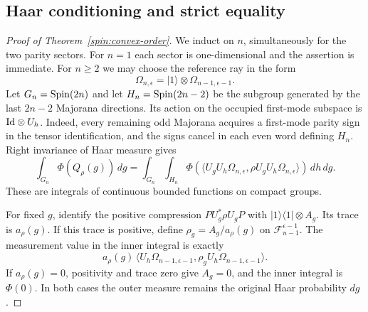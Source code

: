 \subsection{Haar conditioning and strict equality}

\begin{proof}[Proof of Theorem~\ref{spin:convex-order}]
We induct on $n$, simultaneously for the two parity sectors.  For $n=1$
each sector is one-dimensional and the assertion is immediate.  For
$n\ge2$ we may choose the reference ray in the form
\[
 \Omega_{n,\epsilon}=|1\rangle\otimes\Omega_{n-1,\epsilon-1}.
\]
Let $G_n=\operatorname{Spin}(2n)$ and let $H_n=\operatorname{Spin}(2n-2)$ be the subgroup
generated by the last $2n-2$ Majorana directions.  Its action on the
occupied first-mode subspace is $\mathrm{Id}\otimes U_h$.  Indeed, every
remaining odd Majorana acquires a first-mode parity sign in the tensor
identification, and the signs cancel in each even word defining $H_n$.
Right invariance of Haar measure gives
\begin{equation}
 \int_{G_n}\Phi(Q_\rho(g))\,dg
 =\int_{G_n}\int_{H_n}
  \Phi\!\left(\langle U_gU_h\Omega_{n,\epsilon},
                  \rho U_gU_h\Omega_{n,\epsilon}\rangle\right)\,dh\,dg.
 \label{spin:double-haar}
\end{equation}
These are integrals of continuous bounded functions on compact groups.

For fixed $g$, identify the positive compression
$P U_g^*\rho U_gP$ with $|1\rangle\langle1|\otimes A_g$.
Its trace is $a_\rho(g)$.  If this trace is positive, define
$\rho_g=A_g/a_\rho(g)$ on $\mathcal F_{n-1}^{\epsilon-1}$.
The measurement value in the inner integral is exactly
\begin{equation}
 a_\rho(g)\,
 \langle U_h\Omega_{n-1,\epsilon-1},
         \rho_gU_h\Omega_{n-1,\epsilon-1}\rangle.
 \label{spin:conditioning}
\end{equation}
If $a_\rho(g)=0$, positivity and trace zero give $A_g=0$, and the
inner integral is $\Phi(0)$.  In both cases the outer measure remains
the original Haar probability $dg$.


\end{proof}
